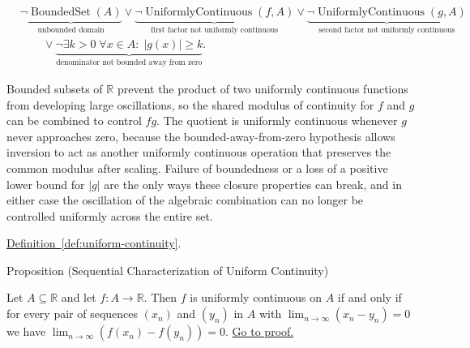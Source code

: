 \begin{remark*}
\[
\begin{aligned}
&\underbrace{\neg\operatorname{BoundedSet}(A)}_{\text{unbounded domain}}
\lor
\underbrace{\neg\operatorname{UniformlyContinuous}(f,A)}_{\text{first factor not uniformly continuous}}
\lor
\underbrace{\neg\operatorname{UniformlyContinuous}(g,A)}_{\text{second factor not uniformly continuous}}\\
&\qquad\lor
\underbrace{\neg\exists k>0\;\forall x\in A:\; |g(x)|\ge k}_{\text{denominator not bounded away from zero}}.
\end{aligned}
\]
\end{remark*}

\begin{remark*}[Interpretation]
Bounded subsets of $\mathbb{R}$ prevent the product of two uniformly continuous functions from developing large oscillations, so the shared modulus of continuity for $f$ and $g$ can be combined to control $fg$. The quotient is uniformly continuous whenever $g$ never approaches zero, because the bounded-away-from-zero hypothesis allows inversion to act as another uniformly continuous operation that preserves the common modulus after scaling. Failure of boundedness or a loss of a positive lower bound for $|g|$ are the only ways these closure properties can break, and in either case the oscillation of the algebraic combination can no longer be controlled uniformly across the entire set.
\end{remark*}

\begin{dependencies}
\hyperref[def:uniform-continuity]{Definition~\ref*{def:uniform-continuity}}.
\end{dependencies}


\begin{propositionbox}{Proposition (Sequential Characterization of Uniform Continuity)}
\begin{proposition}
\label{prop:sequential-uniform-continuity}
Let $A \subseteq \mathbb{R}$ and let $f:A \to \mathbb{R}$. Then $f$ is uniformly continuous on $A$ if and only if for every pair of sequences $(x_n)$ and $(y_n)$ in $A$ with $\lim_{n \to \infty} (x_n - y_n) = 0$ we have $\lim_{n \to \infty} (f(x_n) - f(y_n)) = 0$.
\hyperref[prf:sequential-uniform-continuity]{Go to proof.}
\end{proposition}
\end{propositionbox}

